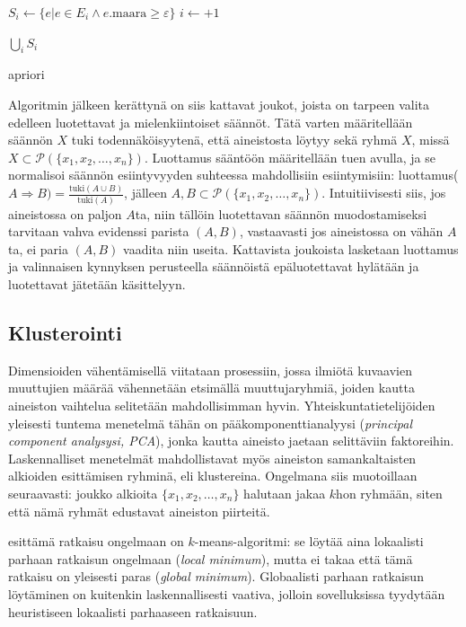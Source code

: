 \documentclass[finnish,gradu,twoside,12pt]{tktltiki}
\begin{document}
{\begin{algorithm}
\begin{algorithmic}
	\EndFor 

		\State $S_i \gets \{ e | e \in E_i \land e.\mathrm{maara} \geq \varepsilon \}$
		\State $i \gets +1$
\EndWhile

\Return $\bigcup_i S_i$
\end{algorithmic}
\caption{apriori}
\label{algo:apriori}
\end{algorithm}

Algoritmin jälkeen kerättynä on siis kattavat joukot, joista on tarpeen valita edelleen luotettavat ja mielenkiintoiset säännöt. Tätä varten määritellään säännön $X$ tuki todennäköisyytenä, että aineistosta löytyy sekä ryhmä $X$, missä $X \subset \mathcal{P}( \{ x_1, x_2, \ldots , x_n \} )$. Luottamus sääntöön määritellään tuen avulla, ja se normalisoi säännön esiintyvyyden suhteessa mahdollisiin esiintymisiin: luottamus($A \Rightarrow B) = \frac{ \mathrm{tuki}(A \cup B)}{ \mathrm{tuki}(A)}$, jälleen $A,B \subset \mathcal{P}( \{ x_1, x_2, \ldots , x_n \} )$. Intuitiivisesti siis, jos aineistossa on paljon $A$ta, niin tällöin luotettavan säännön muodostamiseksi tarvitaan vahva evidenssi parista $(A,B)$, vastaavasti jos aineistossa on vähän $A$ta, ei paria $(A,B)$ vaadita niin useita. Kattavista joukoista lasketaan luottamus ja valinnaisen kynnyksen perusteella säännöistä epäluotettavat hylätään ja luotettavat jätetään käsittelyyn.

\subsection{Klusterointi}

Dimensioiden vähentämisellä viitataan prosessiin, jossa ilmiötä kuvaavien muuttujien määrää vähennetään etsimällä muuttujaryhmiä, joiden kautta aineiston vaihtelua selitetään mahdollisimman hyvin. Yhteiskuntatietelijöiden yleisesti tuntema menetelmä tähän on pääkomponenttianalyysi (\textit{principal component analysysi, PCA}), jonka kautta aineisto jaetaan selittäviin faktoreihin. Laskennalliset menetelmät mahdollistavat myös aineiston samankaltaisten alkioiden esittämisen ryhminä, eli klustereina. Ongelmana siis muotoillaan seuraavasti: joukko alkioita $\{ x_1, x_2, \ldots, x_n \}$ halutaan jakaa $k$hon ryhmään, siten että nämä ryhmät edustavat aineiston piirteitä.

\citet{llyod1982} esittämä ratkaisu ongelmaan on $k$-means-algoritmi: se löytää aina lokaalisti parhaan ratkaisun ongelmaan (\textit{local minimum}), mutta ei takaa että tämä ratkaisu on yleisesti paras (\textit{global minimum}). Globaalisti parhaan ratkaisun löytäminen on kuitenkin laskennallisesti vaativa, jolloin sovelluksissa tyydytään heuristiseen lokaalisti parhaaseen ratkaisuun.

}
\end{document}
